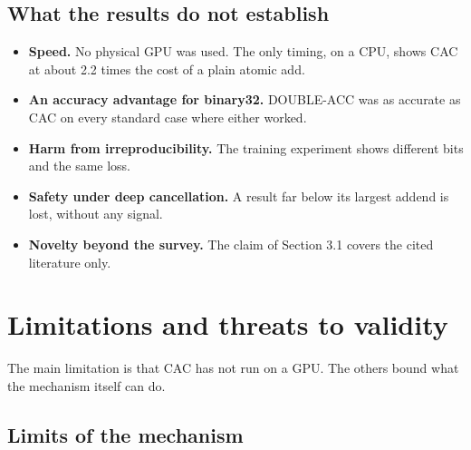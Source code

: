 \documentclass[3p,10pt]{elsarticle}
\begin{document}
\hypertarget{what-the-results-do-not-establish}{%
\subsection{What the results do not
establish}\label{what-the-results-do-not-establish}}

\begin{itemize}
\item
  \textbf{Speed.} No physical GPU was used. The only timing, on a CPU,
  shows CAC at about 2.2 times the cost of a plain atomic add.
\item
  \textbf{An accuracy advantage for binary32.} DOUBLE-ACC was as
  accurate as CAC on every standard case where either worked.
\item
  \textbf{Harm from irreproducibility.} The training experiment shows
  different bits and the same loss.
\item
  \textbf{Safety under deep cancellation.} A result far below its
  largest addend is lost, without any signal.
\item
  \textbf{Novelty beyond the survey.} The claim of Section 3.1 covers
  the cited literature only.
\end{itemize}

\hypertarget{limitations-and-threats-to-validity}{%
\section{Limitations and threats to
validity}\label{limitations-and-threats-to-validity}}

The main limitation is that CAC has not run on a GPU. The others bound
what the mechanism itself can do.

\hypertarget{limits-of-the-mechanism}{%
\subsection{Limits of the mechanism}\label{limits-of-the-mechanism}}
\end{document}
